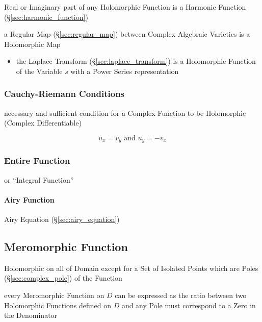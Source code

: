 Real or Imaginary part of any Holomorphic Function is a Harmonic
Function (\S\ref{sec:harmonic_function})

a Regular Map (\S\ref{sec:regular_map}) between Complex Algebraic Varieties is
a Holomorphic Map


\begin{itemize}
  \item the Laplace Transform (\S\ref{sec:laplace_transform}) is a Holomorphic
    Function of the Variable $s$ with a Power Series representation
\end{itemize}



\subsubsection{Cauchy-Riemann Conditions}\label{sec:cauchy_riemann}

necessary and sufficient condition for a Complex Function to be Holomorphic
(Complex Differentiable)

\[
  u_x = v_y \text{ and } u_y = - v_x
\]



\subsubsection{Entire Function}\label{sec:entire_function}

or ``Integral Function''



\paragraph{Airy Function}\label{sec:airy_function}\hfill

Airy Equation (\S\ref{sec:airy_equation})



\subsection{Meromorphic Function}\label{sec:meromorphic_function}

Holomorphic on all of Domain except for a Set of Isolated Points which are
Poles (\S\ref{sec:complex_pole}) of the Function

every Meromorphic Function on $D$ can be expressed as the ratio between two
Holomorphic Functions defined on $D$ and any Pole must correspond to a Zero in
the Denominator

